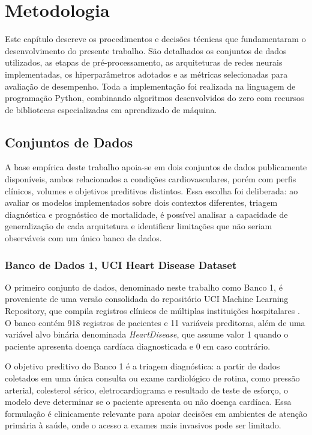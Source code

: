 \chapter{Metodologia}
\label{cap:metodologia}

Este capítulo descreve os procedimentos e decisões técnicas que fundamentaram o desenvolvimento do presente trabalho. São detalhados os conjuntos de dados utilizados, as etapas de pré-processamento, as arquiteturas de redes neurais implementadas, os hiperparâmetros adotados e as métricas selecionadas para avaliação de desempenho. Toda a implementação foi realizada na linguagem de programação Python, combinando algoritmos desenvolvidos do zero com recursos de bibliotecas especializadas em aprendizado de máquina.

\section{Conjuntos de Dados}

A base empírica deste trabalho apoia-se em dois conjuntos de dados publicamente disponíveis, ambos relacionados a condições cardiovasculares, porém com perfis clínicos, volumes e objetivos preditivos distintos. Essa escolha foi deliberada: ao avaliar os modelos implementados sobre dois contextos diferentes, triagem diagnóstica e prognóstico de mortalidade, é possível analisar a capacidade de generalização de cada arquitetura e identificar limitações que não seriam observáveis com um único banco de dados.

\subsection{Banco de Dados 1, UCI Heart Disease Dataset}

O primeiro conjunto de dados, denominado neste trabalho como Banco 1, é proveniente de uma versão consolidada do repositório UCI Machine Learning Repository, que compila registros clínicos de múltiplas instituições hospitalares \cite{fedesoriano2021}. O banco contém 918 registros de pacientes e 11 variáveis preditoras, além de uma variável alvo binária denominada \textit{HeartDisease}, que assume valor 1 quando o paciente apresenta doença cardíaca diagnosticada e 0 em caso contrário.

O objetivo preditivo do Banco 1 é a triagem diagnóstica: a partir de dados coletados em uma única consulta ou exame cardiológico de rotina, como pressão arterial, colesterol sérico, eletrocardiograma e resultado de teste de esforço, o modelo deve determinar se o paciente apresenta ou não doença cardíaca. Essa formulação é clinicamente relevante para apoiar decisões em ambientes de atenção primária à saúde, onde o acesso a exames mais invasivos pode ser limitado.

